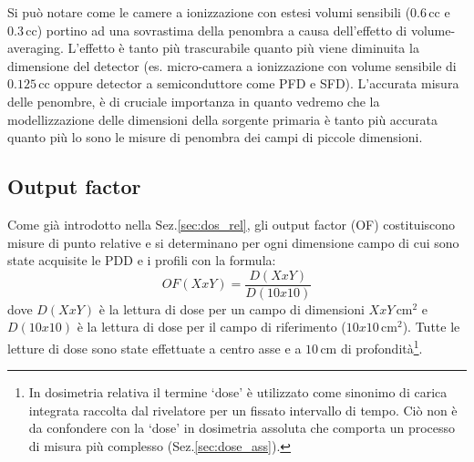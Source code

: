 Si può notare come le camere a ionizzazione con estesi volumi sensibili ($0.6\,$cc e $0.3\,$cc) portino ad una sovrastima della penombra a causa dell'effetto di volume-averaging. L'effetto è tanto più trascurabile quanto più viene diminuita la dimensione del detector (es. micro-camera a ionizzazione con volume sensibile di $0.125\,$cc oppure detector a semiconduttore come PFD e SFD). L'accurata misura delle penombre, è di cruciale importanza in quanto vedremo che la modellizzazione delle dimensioni della sorgente primaria è tanto più accurata quanto più lo sono le misure di penombra dei campi di piccole dimensioni.

\subsection{Output factor}
Come già introdotto nella Sez.\ref{sec:dos_rel}, gli output factor (OF) costituiscono misure di punto relative e si determinano per ogni dimensione campo di cui sono state acquisite le PDD e i profili con la formula:
\begin{equation}
\label{eq:OF}
OF(XxY)=\frac{D(XxY)}{D(10x10)}
\end{equation}
dove $D(XxY)$ è la lettura di dose per un campo di dimensioni $XxY\,$cm$^2$ e $D(10x10)$ è la lettura di dose per il campo di riferimento ($10x10\,$cm$^2$). Tutte le letture di dose sono state effettuate a centro asse e a $10\,$cm di profondità\footnote{In dosimetria relativa il termine `dose' è utilizzato come sinonimo di carica integrata raccolta dal rivelatore per un fissato intervallo di tempo.  Ciò non è da confondere con la `dose' in dosimetria assoluta che comporta un processo di misura più complesso (Sez.\ref{sec:dose_ass}).}.

